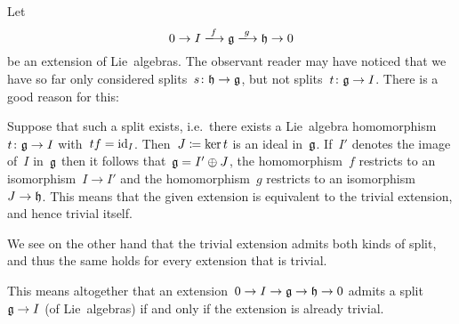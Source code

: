 \begin{warning}
  Let
  \[
    0
    \to
    I
    \xlongto{f}
    \glie
    \xlongto{g}
    \hlie
    \to
    0
  \]
  be an extension of Lie~algebras.
  The observant reader may have noticed that we have so far only considered splits~$s \colon \mathfrak{h} \to \mathfrak{g}$, but not splits~$t \colon \mathfrak{g} \to I$.
  There is a good reason for this:
  
  Suppose that such a split exists, i.e.\ there exists a Lie~algebra homomorphism~$t \colon \mathfrak{g} \to I$ with~$t {} f = \operatorname{id}_I$.
  Then~$J \coloneqq \ker t$ is an ideal in~$\mathfrak{g}$.
  If~$I'$ denotes the image of~$I$ in~$\mathfrak{g}$ then it follows that~$\mathfrak{g} = I' \oplus J$, the homomorphism~$f$ restricts to an isomorphism~$I \to I'$ and the homomorphism~$g$ restricts to an isomorphism~$J \to \mathfrak{h}$.
  This means that the given extension is equivalent to the trivial extension, and hence trivial itself.
  
  We see on the other hand that the trivial extension admits both kinds of split, and thus the same holds for every extension that is trivial.
  
  This means altogether that an extension~$0 \to I \to \mathfrak{g} \to \mathfrak{h} \to 0$ admits a split~$\mathfrak{g} \to I$ (of Lie~algebras) if and only if the extension is already trivial.
\end{warning}




